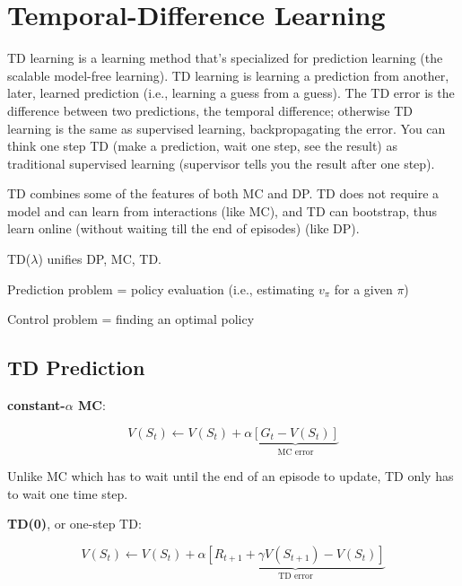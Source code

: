 \documentclass[sutton_barto_notes.tex]{subfiles}
\begin{document}
\newpage
\section{Temporal-Difference Learning}

TD learning is a learning method that's specialized for prediction learning (the scalable model-free learning). TD learning is learning a prediction from another, later, learned prediction (i.e., learning a guess from a guess).
The TD error is the difference between two predictions, the temporal difference; otherwise TD learning is the same as supervised learning, backpropagating the error.
You can think one step TD (make a prediction, wait one step, see the result) as traditional supervised learning (supervisor tells you the result after one step).

TD combines some of the features of both MC and DP. TD does not require a model and can learn from interactions (like MC), and TD can bootstrap, thus learn online (without waiting till the end of episodes) (like DP).

TD($\lambda$) unifies DP, MC, TD.

Prediction problem = policy evaluation (i.e., estimating $v_\pi$ for a given $\pi$)

Control problem = finding an optimal policy

\subsection{TD Prediction}

\begin{definition}
\textbf{constant-$\alpha$ MC}:

$$V(S_t) \leftarrow V(S_t) + \alpha \underbrace{[G_t - V(S_t)]}_\text{MC error} $$
\end{definition}

Unlike MC which has to wait until the end of an episode to update, TD only has to wait one time step.

\begin{definition}
\textbf{TD(0)}, or one-step TD:

$$ V(S_t) \leftarrow V(S_t) + \alpha \underbrace{[R_{t+1} + \gamma V(S_{t+1}) - V(S_t)]}_\text{TD error}$$
\end{definition}
\end{document}
